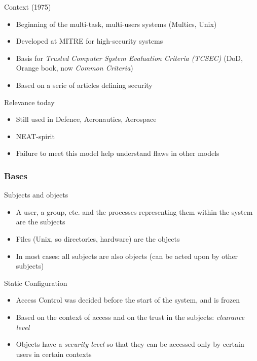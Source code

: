 \begin{reveals}
\begin{frame}
    \begin{block}{Context (1975)}
      \begin{itemize}
      \item Beginning of the multi-task, multi-users systems (Multics, Unix)
      \item Developed at MITRE for high-security systems
      \item Basis for \emph{Trusted Computer System Evaluation
          Criteria (TCSEC)} (DoD, Orange book, now \emph{Common Criteria})
      \item Based on a serie of articles defining security
      \end{itemize}
    \end{block}


  \pause

  \begin{block}{Relevance today}
    \begin{itemize}
    \item Still used in Defence, Aeronautics, Aerospace
    \item NEAT-spirit
    \item Failure to meet this model help understand flaws in other models
    \end{itemize}
  \end{block}
\end{frame}


\begin{frame}
  \frametitle{Bases}

  \begin{block}{Subjects and objects}
    \begin{itemize}
    \item A user, a group, etc. and the processes representing them
      within the system are the subjects
    \item Files (Unix, so directories, hardware) are the objects
    \item In most cases: all subjects are also objects (can be acted
      upon by other subjects)
    \end{itemize}
  \end{block}

  \begin{block} {Static Configuration}
    \begin{itemize}
    \item Access Control was decided before the start of the system,
      and is frozen
    \item Based on the context of access and on the trust in the subjects:
      \emph{clearance level}
    \item Objects have a \emph{security level} so that they can be
      accessed only by certain users in certain contexts
    \end{itemize}
  \end{block}



\end{frame}
\end{reveals}
